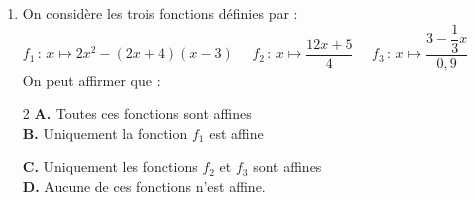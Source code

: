 \documentclass[a4paper,11pt]{article}
\begin{document}
\begin{seance}{}
\begin{enumerate}
\item On considère les trois fonctions définies  par : \\
        $f_1\,:\,x \longmapsto 2x^2-(2x+4)(x-3)$\,\,\,\,\,\,\,\,$f_2\,:\,x \longmapsto \dfrac{12x+5}{4}$\,\,\,\,\,\,\,\,$f_3\,:\,x \longmapsto\dfrac{3-\dfrac{1}{3}x}{0{,}9}$\\        On peut affirmer que :

\begin{multicols}{2}
\textbf{\textcolor{Couleur1}{A.}} Toutes ces fonctions sont affines\\ \textbf{\textcolor{Couleur1}{B.}} Uniquement la fonction $f_1$ est affine 


\columnbreak


\textbf{\textcolor{Couleur1}{C.}} Uniquement les fonctions $f_2$ et $f_3$ sont affines \\
\textbf{\textcolor{Couleur1}{D.}} Aucune de ces fonctions n'est affine.
\end{multicols}


\end{enumerate}

\end{seance}


\newpage
\end{document}
